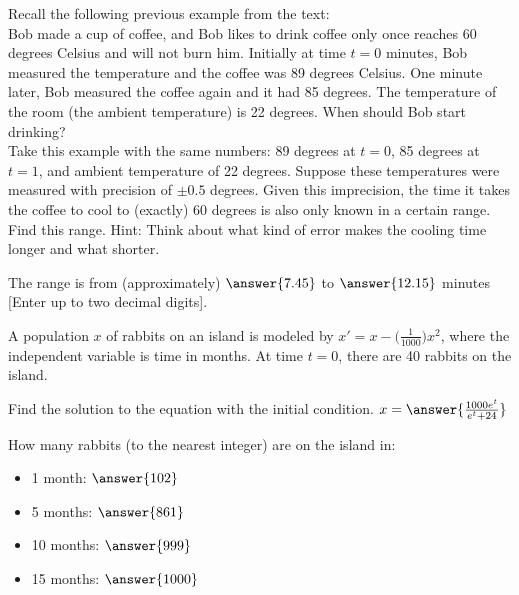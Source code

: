 \documentclass{ximera}
\begin{document}
\begin{exercise}%
    Recall the following previous example from the text:\\
    Bob made a cup of coffee, and Bob likes to drink coffee only once reaches 60 degrees Celsius and will not burn him. Initially at time $t=0$ minutes, Bob measured the temperature and the coffee was 89 degrees Celsius. One minute later, Bob measured the coffee again and it had 85 degrees. The temperature of the room (the ambient temperature) is 22 degrees. When should Bob start drinking?\\
    
    Take this example with the same numbers: 89 degrees at $t=0$, 85 degrees at $t=1$, and ambient temperature of 22 degrees. Suppose these temperatures were measured with precision of $\pm 0.5$ degrees.  Given this imprecision, the time it takes the coffee to cool to (exactly) 60 degrees is also only known in a certain range.  Find this range.  Hint: Think about what kind of error makes the cooling time longer and what shorter.
    
    The range is from (approximately) $\answer{7.45}$ to $\answer{12.15}$ minutes [Enter up to two decimal digits].
\end{exercise}

\begin{exercise}%
    A population $x$ of rabbits on an island is modeled by $x' = x- \bigl(\frac{1}{1000} \bigr) x^2$, where the independent variable is time in months.  At time $t=0$, there are 40 rabbits on the island.
    
    Find the solution to the equation with the initial condition. $x = \answer{\frac{1000e^t}{e^t+24}}$
    \begin{problem}
        How many rabbits (to the nearest integer) are on the island in: 
        \begin{itemize}
        \item 1 month: $\answer{102}$
        \item 5 months: $\answer{861}$
        \item 10 months: $\answer{999}$
        \item 15 months: $\answer{1000}$
        \end{itemize}
    \end{problem}
\end{exercise}

\end{document}
